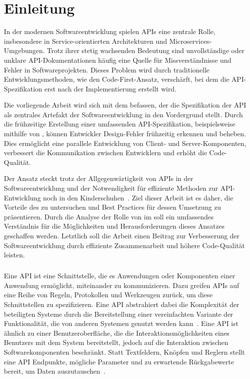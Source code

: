 \chapter{Einleitung}
In der modernen Softwareentwicklung spielen \acp{API} eine zentrale Rolle, insbesondere in Service-orientierten Architekturen und Microservices-Umgebungen.
Trotz ihrer stetig wachsenden Bedeutung sind unvollständige oder unklare \ac{API}-Dokumentationen häufig eine Quelle für Missverständnisse und Fehler in Softwareprojekten.
Dieses Problem wird durch traditionelle Entwicklungsmethoden, wie den Code-First-Ansatz, verschärft, bei dem die \ac{API}-Spezifikation erst nach der Implementierung erstellt wird.

Die vorliegende Arbeit wird sich mit dem \AFA befassen, der die Spezifikation der \ac{API} als zentrales Artefakt der Softwareentwicklung in den Vordergrund stellt.
Durch die frühzeitige Erstellung einer umfassenden \ac{API}-Spezifikation, beispielsweise mithilfe von \OA, können Entwickler Design-Fehler frühzeitig erkennen und beheben.
Dies ermöglicht eine parallele Entwicklung von Client- und Server-Komponenten, verbessert die Kommunikation zwischen Entwicklern und erhöht die Code-Qualität.

Der Ansatz steckt trotz der Allgegenwärtigkeit von \acp{API} in der Softwareentwicklung und der Notwendigkeit für effiziente Methoden zur \ac{API}-Entwicklung noch in den Kinderschuhen~\cite[78]{bea22}.
Ziel dieser Arbeit ist es daher, die Vorteile des \AFAes zu untersuchen und Best Practices für dessen Umsetzung zu präsentieren.
Durch die Analyse der Rolle von \OA im \AFA soll ein umfassendes Verständnis für die Möglichkeiten und Herausforderungen dieses Ansatzes geschaffen werden.
Letztlich soll die Arbeit einen Beitrag zur Verbesserung der Softwareentwicklung durch effiziente Zusammenarbeit und höhere Code-Qualität leisten.

\paragraph{}
Eine \ac{API} ist eine Schnittstelle, die es Anwendungen oder Komponenten einer Anwendung ermöglicht, miteinander zu kommunizieren.
Dazu greifen \acp{API} auf eine Reihe von Regeln, Protokollen und Werkzeugen zurück, um diese Schnittstellen zu spezifizieren.
Eine \ac{API} abstrahiert dabei die Komplexität der beteiligten Systeme durch die Bereitstellung einer vereinfachten Variante der Funktionalität, die von anderen Systemen genutzt werden kann~\cite[1]{kul23}.
Eine \ac{API} ist ähnlich zu einer Benutzeroberfläche, die die Interaktionsmöglichkeiten eines Benutzers mit dem System bereitstellt, jedoch auf die Interaktion zwischen Softwarekomponenten beschränkt.
Statt Textfeldern, Knöpfen und Reglern stellt eine \ac{API} Endpunkte, mögliche Parameter und zu erwartende Rückgabewerte bereit, um Daten auszutauschen~\cites[351]{de23}{ope23a}.

